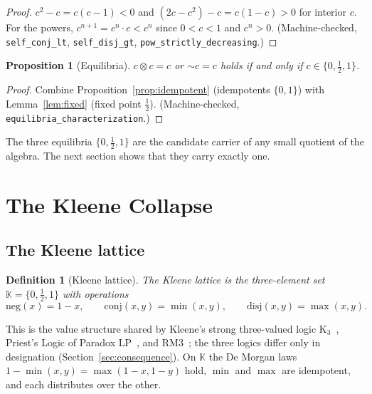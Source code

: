 \documentclass[11pt,a4paper]{article}
\newtheorem{proposition}[theorem]{Proposition}
\newtheorem{definition}[theorem]{Definition}
\newcommand{\negc}{\mathord{\sim}}
\newcommand{\conjc}{\otimes}
\newcommand{\Kl}{\mathbb{K}}
\begin{document}
\begin{proof}
$c^2 - c = c(c-1) < 0$ and $(2c - c^2) - c = c(1-c) > 0$ for
interior $c$.
For the powers, $c^{n+1} = c^n \cdot c < c^n$ since $0 < c < 1$ and
$c^n > 0$.
(Machine-checked, \texttt{self\_conj\_lt}, \texttt{self\_disj\_gt},
\texttt{pow\_strictly\_decreasing}.)
\end{proof}

\begin{proposition}[Equilibria]
\label{prop:equilibria}
$c \conjc c = c$ or $\negc c = c$ holds if and only if
$c \in \{0, \tfrac{1}{2}, 1\}$.
\end{proposition}

\begin{proof}
Combine Proposition~\ref{prop:idempotent} (idempotents $\{0,1\}$)
with Lemma~\ref{lem:fixed} (fixed point $\tfrac{1}{2}$).
(Machine-checked, \texttt{equilibria\_characterization}.)
\end{proof}

The three equilibria $\{0, \tfrac{1}{2}, 1\}$ are the candidate
carrier of any small quotient of the algebra.
The next section shows that they carry exactly one.

\section{The Kleene Collapse}
\label{sec:collapse}

\subsection{The Kleene lattice}

\begin{definition}[Kleene lattice]
\label{def:kleene}
The \emph{Kleene lattice} is the three-element set
$\Kl = \{0, \tfrac{1}{2}, 1\}$ with operations
\[
\mathrm{neg}(x) = 1 - x,
\qquad
\mathrm{conj}(x,y) = \min(x,y),
\qquad
\mathrm{disj}(x,y) = \max(x,y).
\]
\end{definition}

This is the value structure shared by Kleene's strong three-valued
logic K$_3$~\cite{kleene1952}, Priest's Logic of Paradox
LP~\cite{priest1979,asenjo1966}, and RM3~\cite{meyer1972}; the three
logics differ only in designation (Section~\ref{sec:consequence}).
On $\Kl$ the De Morgan laws
$1 - \min(x,y) = \max(1-x, 1-y)$ hold, $\min$ and $\max$ are
idempotent, and each distributes over the other.
\end{document}
